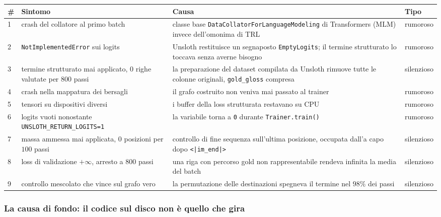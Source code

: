 \begin{center}
\small
\begin{tabular}{p{0.3cm}p{5.2cm}p{5.6cm}l}
\toprule
\# & Sintomo & Causa & Tipo \\
\midrule
1 & crash del collatore al primo batch & classe base \texttt{DataCollatorForLanguageModeling} di Transformers (MLM) invece dell'omonima di TRL & rumoroso \\
2 & \texttt{NotImplementedError} sui logits & Unsloth restituisce un segnaposto \texttt{EmptyLogits}; il termine strutturato lo toccava senza averne bisogno & rumoroso \\
3 & termine strutturato mai applicato, $0$ righe valutate per $800$ passi & la preparazione del dataset compilata da Unsloth rimuove tutte le colonne originali, \texttt{gold\_gloss} compresa & silenzioso \\
4 & crash nella mappatura dei bersagli & il grafo costruito non veniva mai passato al trainer & rumoroso \\
5 & tensori su dispositivi diversi & i buffer della loss strutturata restavano su CPU & rumoroso \\
6 & logits vuoti nonostante \texttt{UNSLOTH\_RETURN\_LOGITS=1} & la variabile torna a \texttt{0} durante \texttt{Trainer.train()} & rumoroso \\
7 & massa ammessa mai applicata, $0$ posizioni per $100$ passi & controllo di fine sequenza sull'ultima posizione, occupata dall'a capo dopo \texttt{<|im\_end|>} & silenzioso \\
8 & loss di validazione $+\infty$, arresto a $800$ passi & una riga con percorso gold non rappresentabile rendeva infinita la media del batch & silenzioso \\
9 & controllo mescolato che vince sul grafo vero & la permutazione delle destinazioni spegneva il termine nel $98\%$ dei passi & silenzioso \\
\bottomrule
\end{tabular}
\end{center}

\subsubsection{La causa di fondo: il codice sul disco non è quello che gira}

